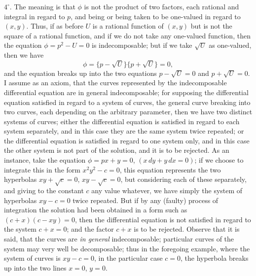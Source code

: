 \documentclass[11pt,a4paper]{article}
\begin{document}
$4^\circ$. The meaning is that $\phi$ is not the product of two factors, each rational and
integral in regard to $p$, and being or being taken to be one-valued in regard to $(x,y)$.
Thus, if as before $U$ is a rational function of $(x,y)$ but is not the square of a
rational function, and if we do not take any one-valued function, then the equation
$\phi=p^2-U=0$ is indecomposable; but if we take $\sqrt{U}$ as one-valued, then we have
\[
\phi=\{p-\sqrt{U}\}\{p+\sqrt{U}\}=0,
\]
and the equation breaks up into the two equations
$p-\sqrt{U}=0$ and $p+\sqrt{U}=0$. I assume as an axiom, that the curves represented by
the indecomposable differential equation are in general indecomposable; for supposing the
differential equation satisfied in regard to a system of curves, the general curve breaking
into two curves, each depending on the arbitrary parameter, then we have two distinct
systems of curves; either the differential equation is satisfied in regard to each system
separately, and in this case they are the same system twice repeated; or the differential
equation is satisfied in regard to one system only, and in this case the other system
is not part of the solution, and it is to be rejected. As an instance, take the equation
$\phi=px+y=0$, $(x\,dy+y\,dx=0)$; if we choose to integrate this in the form $x^2y^2-c=0$,
this equation represents the two hyperbolas $xy+\sqrt{c}=0$, $xy-\sqrt{c}=0$, but considering
each of these separately, and giving to the constant $c$ any value whatever, we
have simply the system of hyperbolas $xy-c=0$ twice repeated. But if by any (faulty)
process of integration the solution had been obtained in a form such as $(c+x)(c-xy)=0$,
then the differential equation is not satisfied in regard to the system $c+x=0$; and
the factor $c+x$ is to be rejected. Observe that it is said, that the curves are \textit{in
general} indecomposable; particular curves of the system may very well be decomposable;
thus in the foregoing example, where the system of curves is $xy-c=0$, in the
particular case $c=0$, the hyperbola breaks up into the two lines $x=0$, $y=0$.

\clearpage
\end{document}
